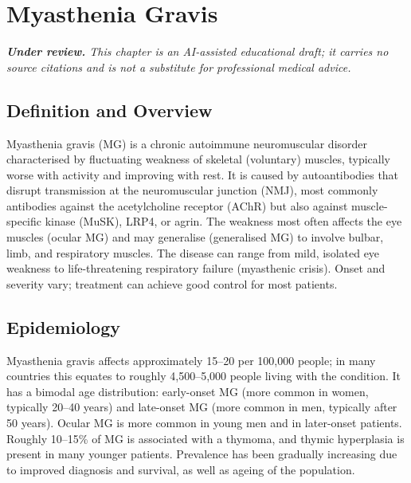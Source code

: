 \chapter{Myasthenia Gravis}

\medskip
\noindent\textit{\textbf{Under review.} This chapter is an AI-assisted educational draft; it carries no source citations and is not a substitute for professional medical advice.}

\section*{Definition and Overview}
Myasthenia gravis (MG) is a chronic autoimmune neuromuscular disorder characterised by fluctuating weakness of skeletal (voluntary) muscles, typically worse with activity and improving with rest. It is caused by autoantibodies that disrupt transmission at the neuromuscular junction (NMJ), most commonly antibodies against the acetylcholine receptor (AChR) but also against muscle-specific kinase (MuSK), LRP4, or agrin. The weakness most often affects the eye muscles (ocular MG) and may generalise (generalised MG) to involve bulbar, limb, and respiratory muscles. The disease can range from mild, isolated eye weakness to life-threatening respiratory failure (myasthenic crisis). Onset and severity vary; treatment can achieve good control for most patients.

\section*{Epidemiology}
Myasthenia gravis affects approximately 15--20 per 100,000 people; in many countries this equates to roughly 4,500--5,000 people living with the condition. It has a bimodal age distribution: early-onset MG (more common in women, typically 20--40 years) and late-onset MG (more common in men, typically after 50 years). Ocular MG is more common in young men and in later-onset patients. Roughly 10--15\% of MG is associated with a thymoma, and thymic hyperplasia is present in many younger patients. Prevalence has been gradually increasing due to improved diagnosis and survival, as well as ageing of the population.

